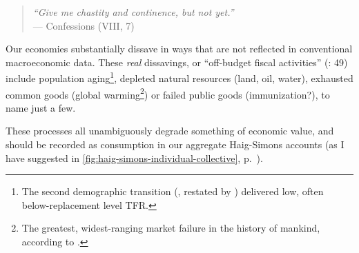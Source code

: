 \begin{quote}
	\emph{``Give me chastity and continence, but not yet.''\\}
	--- \citeauthor{St.AugusteofHippo397} Confessions (VIII, 7)
\end{quote}

Our economies substantially dissave in ways that are not reflected in conventional macroeconomic data. These \emph{real} dissavings, or ``off-budget fiscal activities'' (\citealt{Bonker2006}: 49) include population aging\footnote{
	The second demographic transition (\citealt{Davis1945}, restated by \citealt{Caldwell-1976-aa}) delivered low, often below-replacement level \gls{TFR}.}, 
depleted natural resources (land, oil, water), exhausted common goods (global warming\footnote{
	The greatest, widest-ranging market failure in the history of mankind, according to \cite{Stern-2006-aa}.}) 
or failed public goods (immunization?), to name just a few. 

These processes all unambiguously degrade something of economic value, and should be recorded as consumption in our aggregate Haig-Simons accounts (as I have suggested in \autoref{fig:haig-simons-individual-collective}, p.~\pageref{fig:haig-simons-individual-collective}). %

